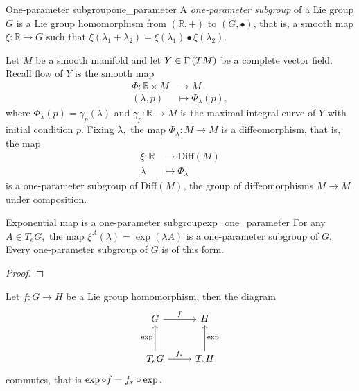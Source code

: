 %

\begin{definition}{One-parameter subgroup}{one_parameter}
    A \emph{one-parameter subgroup} of a Lie group \(G\) is a Lie group homomorphism from \((\mathbb{R}, +)\) to \((G, \bullet)\), that is, a smooth map \(\xi : \mathbb{R} \to G\) such that \(\xi(\lambda_1 + \lambda_2) = \xi(\lambda_1)\bullet\xi(\lambda_2)\).
\end{definition}
\begin{example}
    Let \(M\) be a smooth manifold and let \(Y \in \Gamma\left(TM\right)\) be a complete vector field. Recall flow of \(Y\) is the smooth map
    \begin{align*}
        \Phi : \mathbb{R} \times M &\to M\\
                       (\lambda,p) &\mapsto \Phi_{\lambda}(p),
    \end{align*}
    where \(\Phi_{\lambda}(p) = \gamma_p(\lambda)\) and \(\gamma_p : \mathbb{R} \to M\) is the maximal integral curve of \(Y\) with initial condition \(p\). Fixing \(\lambda,\) the map \(\Phi_{\lambda} : M \to M\) is a diffeomorphism, that is, the map
    \begin{align*}
        \xi : \mathbb{R} &\to \mathrm{Diff}(M)\\
                 \lambda &\mapsto \Phi_{\lambda}
    \end{align*}
    is a one-parameter subgroup of \(\mathrm{Diff}(M)\), the group of diffeomorphisms \(M \to M\) under composition.
\end{example}

\begin{theorem}{Exponential map is a one-parameter subgroup}{exp_one_parameter}
    For any \(A \in T_eG,\) the map \(\xi^A(\lambda) = \exp(\lambda A)\) is a one-parameter subgroup of \(G.\) Every one-parameter subgroup of \(G\) is of this form.
\end{theorem}
\begin{proof}
    \todo
\end{proof}

\begin{theorem}{}{}
    Let \(f : G \to H\) be a Lie group homomorphism, then the diagram
    \begin{equation*}
        \begin{tikzcd}[column sep = normal, row sep = large]
            G \arrow{r}{f} & H\\
            T_eG \arrow{u}{\exp} \arrow{r}{\pf{f}} & T_eH \arrow[swap]{u}{\exp}
        \end{tikzcd}
    \end{equation*}
    commutes, that is \(\exp\circ f = {f}_{\ast{}} \circ \exp.\)
\end{theorem}
